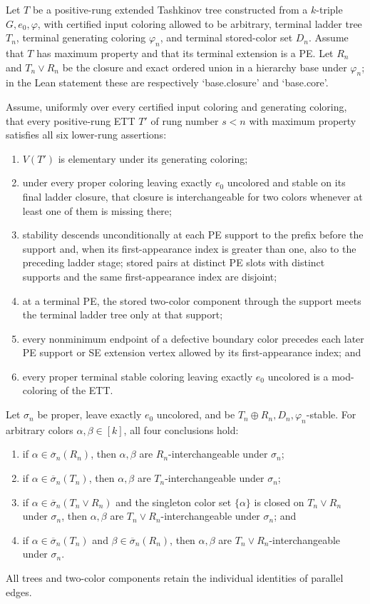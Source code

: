 \begin{lemma}
Let $T$ be a positive-rung extended Tashkinov tree constructed from a
$k$-triple $G,e_0,\varphi$, with certified input coloring allowed to
be arbitrary, terminal ladder tree $T_n$, terminal generating coloring
$\varphi_n$, and terminal stored-color set $D_n$.  Assume that $T$
has maximum property and that its terminal extension is a PE.  Let
$R_n$ and $T_n\vee R_n$ be the closure and exact ordered union in a
hierarchy base under $\varphi_n$; in the Lean statement these are
respectively `base.closure' and `base.core'.

Assume, uniformly over every certified input coloring and generating
coloring, that every positive-rung ETT $T'$ of rung number $s<n$
with maximum property satisfies all six lower-rung assertions:
\begin{enumerate}
\item $V(T')$ is elementary under its generating coloring;
\item under every proper coloring leaving exactly $e_0$ uncolored and
stable on its final ladder closure, that closure is interchangeable for
two colors whenever at least one of them is missing there;
\item stability descends unconditionally at each PE support to the prefix before the
support and, when its first-appearance index is greater than one, also to
the preceding ladder stage; stored pairs at
distinct PE slots with distinct supports and the same first-appearance
index are disjoint;
\item at a terminal PE, the stored two-color component through the
support meets the terminal ladder tree only at that support;
\item every nonminimum endpoint of a defective boundary color precedes
each later PE support or SE extension vertex allowed by its
first-appearance index; and
\item every proper terminal stable coloring leaving exactly $e_0$
uncolored is a mod-coloring of the ETT.
\end{enumerate}

Let $\sigma_n$ be proper, leave exactly $e_0$ uncolored, and be
$T_n\oplus R_n,D_n,\varphi_n$-stable.  For arbitrary colors
$\alpha,\beta\in[k]$, all four conclusions hold:
\begin{enumerate}
\item if $\alpha\in\overline\sigma_n(R_n)$, then $\alpha,\beta$
are $R_n$-interchangeable under $\sigma_n$;
\item if $\alpha\in\overline\sigma_n(T_n)$, then $\alpha,\beta$
are $T_n$-interchangeable under $\sigma_n$;
\item if $\alpha\in\overline\sigma_n(T_n\vee R_n)$ and the singleton
color set $\{\alpha\}$ is closed on $T_n\vee R_n$ under
$\sigma_n$, then $\alpha,\beta$ are
$T_n\vee R_n$-interchangeable under $\sigma_n$; and
\item if $\alpha\in\overline\sigma_n(T_n)$ and
$\beta\in\overline\sigma_n(R_n)$, then $\alpha,\beta$ are
$T_n\vee R_n$-interchangeable under $\sigma_n$.
\end{enumerate}
All trees and two-color components retain the individual identities of
parallel edges.
\end{lemma}
